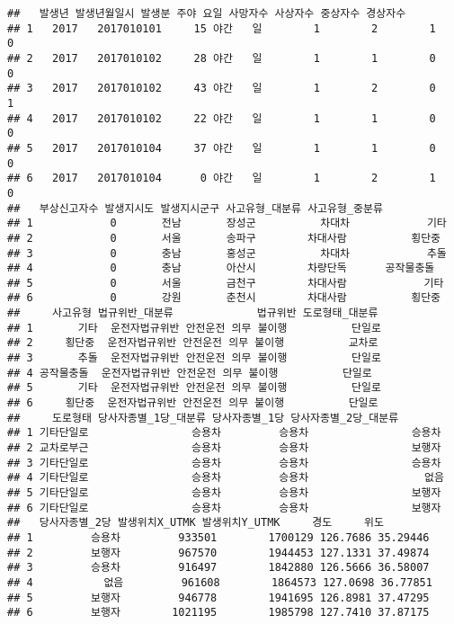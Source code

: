 \documentclass[]{article}
\begin{document}
\begin{verbatim}
##   발생년 발생년월일시 발생분 주야 요일 사망자수 사상자수 중상자수 경상자수
## 1   2017   2017010101     15 야간   일        1        2        1        0
## 2   2017   2017010102     28 야간   일        1        1        0        0
## 3   2017   2017010102     43 야간   일        1        2        0        1
## 4   2017   2017010102     22 야간   일        1        1        0        0
## 5   2017   2017010104     37 야간   일        1        1        0        0
## 6   2017   2017010104      0 야간   일        1        2        1        0
##   부상신고자수 발생지시도 발생지시군구 사고유형_대분류 사고유형_중분류
## 1            0       전남       장성군          차대차            기타
## 2            0       서울       송파구        차대사람          횡단중
## 3            0       충남       홍성군          차대차            추돌
## 4            0       충남       아산시        차량단독      공작물충돌
## 5            0       서울       금천구        차대사람            기타
## 6            0       강원       춘천시        차대사람          횡단중
##     사고유형 법규위반_대분류             법규위반 도로형태_대분류
## 1       기타  운전자법규위반 안전운전 의무 불이행          단일로
## 2     횡단중  운전자법규위반 안전운전 의무 불이행          교차로
## 3       추돌  운전자법규위반 안전운전 의무 불이행          단일로
## 4 공작물충돌  운전자법규위반 안전운전 의무 불이행          단일로
## 5       기타  운전자법규위반 안전운전 의무 불이행          단일로
## 6     횡단중  운전자법규위반 안전운전 의무 불이행          단일로
##     도로형태 당사자종별_1당_대분류 당사자종별_1당 당사자종별_2당_대분류
## 1 기타단일로                승용차         승용차                승용차
## 2 교차로부근                승용차         승용차                보행자
## 3 기타단일로                승용차         승용차                승용차
## 4 기타단일로                승용차         승용차                  없음
## 5 기타단일로                승용차         승용차                보행자
## 6 기타단일로                승용차         승용차                보행자
##   당사자종별_2당 발생위치X_UTMK 발생위치Y_UTMK     경도     위도
## 1         승용차         933501        1700129 126.7686 35.29446
## 2         보행자         967570        1944453 127.1331 37.49874
## 3         승용차         916497        1842880 126.5666 36.58007
## 4           없음         961608        1864573 127.0698 36.77851
## 5         보행자         946778        1941695 126.8981 37.47295
## 6         보행자        1021195        1985798 127.7410 37.87175
\end{verbatim}
\end{document}
